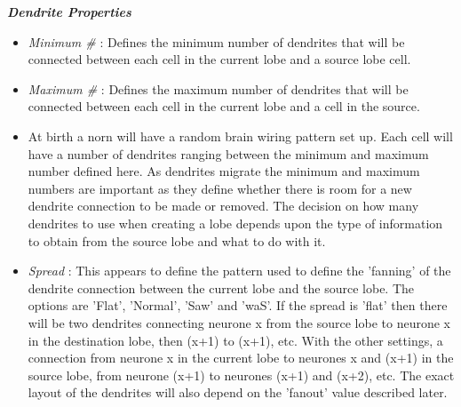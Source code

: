 \documentclass[11pt,twoside,a4paper]{article}
\begin{document}
\textbf{\textit{Dendrite Properties}}
\begin{itemize}
	\item[] \emph{Minimum \#} : Defines the minimum number of dendrites that will be connected between each cell in the current lobe and a source lobe cell.
	\item[] \emph{Maximum \#} : Defines the maximum number of dendrites that will be connected between each cell in the current lobe and a cell in the source. %
	\item At birth a norn will have a random brain wiring pattern set up. Each cell will have a number of dendrites ranging between the minimum and maximum number defined here. As dendrites migrate the minimum and maximum numbers are important as they define whether there is room for a new dendrite connection to be made or removed. The decision on how many dendrites to use when creating a lobe depends upon the type of information to obtain from the source lobe and what to do with it.
	\item[] \emph{Spread} : This appears to define the pattern used to define the 'fanning' of the dendrite connection between the current lobe and the source lobe. The options are 'Flat', 'Normal', 'Saw' and 'waS'. If the spread is 'flat' then there will be two dendrites connecting neurone x from the source lobe to neurone x in the destination lobe, then (x+1) to (x+1), etc. With the other settings, a connection from neurone x in the current lobe to neurones x and (x+1) in the source lobe, from neurone (x+1) to neurones (x+1) and (x+2), etc. The exact layout of the dendrites will also depend on the 'fanout' value described later.
\end{itemize}~\\
\end{document}
